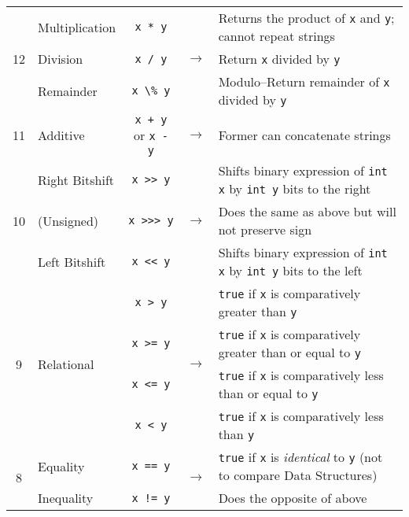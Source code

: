 \documentclass{article}
\begin{document}
\begin{center}
\begin{tabularx}{\textwidth}{clccX}
\multirow{3}{*}{12}  & Multiplication    & \lstinline|x * y| & \multirow{3}{*}{\(\to\)} & Returns the product of \lstinline|x| and \lstinline|y|; cannot repeat strings\\
    & Division          & \lstinline|x / y| & & Return \lstinline|x| divided by \lstinline|y|\\
    & Remainder         & \lstinline|x \% y| & & Modulo--Return remainder of \lstinline|x| divided by \lstinline|y|\\\midrule

11  & Additive          & \lstinline|x + y| or \lstinline|x - y| & \(\to\) & Former can concatenate strings\\\midrule

\multirow{3}{*}{10} & Right Bitshift & \lstinline|x >> y| & \multirow{3}{*}{\(\to\)} & Shifts binary expression of \lstinline|int x| by \lstinline|int y| bits to the right\\
& (Unsigned) & \lstinline|x >>> y| & & Does the same as above but will not preserve sign\\
& Left Bitshift & \lstinline|x << y| & & Shifts binary expression of \lstinline|int x| by \lstinline|int y| bits to the left\\\midrule

\multirow{4}{*}{9}  & \multirow{4}{*}{Relational} & \lstinline|x > y| & \multirow{4}{*}{\(\to\)} & \lstinline|true| if \lstinline|x| is comparatively greater than \lstinline|y| \\
& & \lstinline|x >= y| & & \lstinline|true| if \lstinline|x| is comparatively greater than or equal to \lstinline|y| \\
& & \lstinline|x <= y| & & \lstinline|true| if \lstinline|x| is comparatively less than or equal to \lstinline|y| \\
& & \lstinline|x < y| & & \lstinline|true| if \lstinline|x| is comparatively less than \lstinline|y| \\\midrule

\multirow{2}{*}{8} & Equality & \lstinline|x == y| & \multirow{2}{*}{\(\to\)} & \lstinline|true| if \lstinline|x| is \textit{identical} to \lstinline|y| (not to compare Data Structures)\\
& Inequality & \lstinline|x != y| &  & Does the opposite of above\\\midrule


\end{tabularx}
\end{center}
\end{document}
